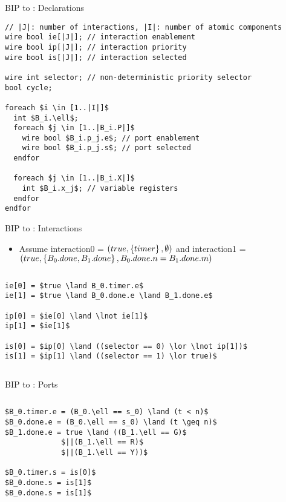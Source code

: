 \begin{frame}[containsverbatim]{BIP to \thislanguage: Declarations}
  \begin{lstlisting}[basicstyle=\scriptsize\ttfamily]
// |J|: number of interactions, |I|: number of atomic components
wire bool ie[|J|]; // interaction enablement 
wire bool ip[|J|]; // interaction priority
wire bool is[|J|]; // interaction selected

wire int selector; // non-deterministic priority selector
bool cycle; 

foreach $i \in [1..|I|]$
  int $B_i.\ell$;
  foreach $j \in [1..|B_i.P|]$ 
    wire bool $B_i.p_j.e$; // port enablement
    wire bool $B_i.p_j.s$; // port selected
  endfor 
    
  foreach $j \in [1..|B_i.X|]$ 
    int $B_i.x_j$; // variable registers
  endfor
endfor
  \end{lstlisting}
\end{frame}

\begin{frame}[containsverbatim]{BIP to \thislanguage: Interactions}
\begin{itemize}
 \item {\small Assume interaction0 = $(true,\left\{ timer \right\},\emptyset)$
 and interaction1 = $(true, \left\{ B_0.done, B_1.done \right\}, B_0.done.n = B_1.done.m)$}
\end{itemize}
\begin{columns}
 \begin{lstlisting}
ie[0] = $true \land B_0.timer.e$
ie[1] = $true \land B_0.done.e \land B_1.done.e$

ip[0] = $ie[0] \land \lnot ie[1]$
ip[1] = $ie[1]$

is[0] = $ip[0] \land ((selector == 0) \lor \lnot ip[1])$
is[1] = $ip[1] \land ((selector == 1) \lor true)$
 \end{lstlisting}
    \resizebox{0.9\textwidth}{!}{
  
}
\end{columns}
\end{frame}

\begin{frame}[containsverbatim]{BIP to \thislanguage: Ports}
\begin{columns}
 \begin{lstlisting}
$B_0.timer.e = (B_0.\ell == s_0) \land (t < n)$
$B_0.done.e = (B_0.\ell == s_0) \land (t \geq n)$
$B_1.done.e = true \land ((B_1.\ell == G)$ 
             $||(B_1.\ell == R)$
             $||(B_1.\ell == Y))$
             
$B_0.timer.s = is[0]$
$B_0.done.s = is[1]$
$B_0.done.s = is[1]$
 \end{lstlisting}
    \resizebox{0.9\textwidth}{!}{
  
}
\end{columns}
\end{frame}

